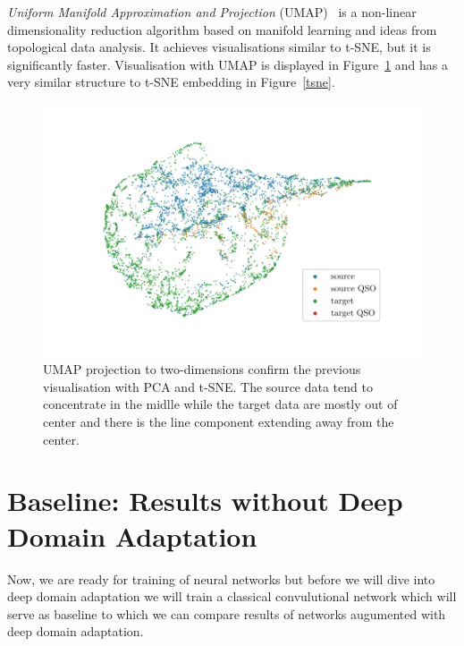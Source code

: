 \textit{Uniform Manifold Approximation and Projection} (UMAP)~\cite{mcinnes2018}
is a non-linear dimensionality reduction algorithm based on manifold learning and ideas from topological data analysis.
It achieves visualisations similar to t-SNE, but it is significantly faster.
Visualisation with UMAP is displayed in Figure~\ref{umap}
and has a very similar structure to t-SNE embedding in Figure~\ref{tsne}.

\begin{figure}
\includegraphics[width=\textwidth]{img/umap.pdf}
\caption[UMAP visualisation of source and target data distributions]{
	UMAP projection to two-dimensions confirm the previous visualisation
	with PCA and t-SNE.
	The source data tend to concentrate in the midlle
	while the target data are mostly out of center
	and there is the line component extending away from the center.
	}
\label{umap}
\end{figure}

\section{Baseline: Results without Deep Domain Adaptation}
\label{baseline}

Now, we are ready for training of neural networks
but before we will dive into deep domain adaptation
we will train a classical convulutional network
which will serve as baseline to
which we can compare results of networks augumented with deep domain adaptation.


